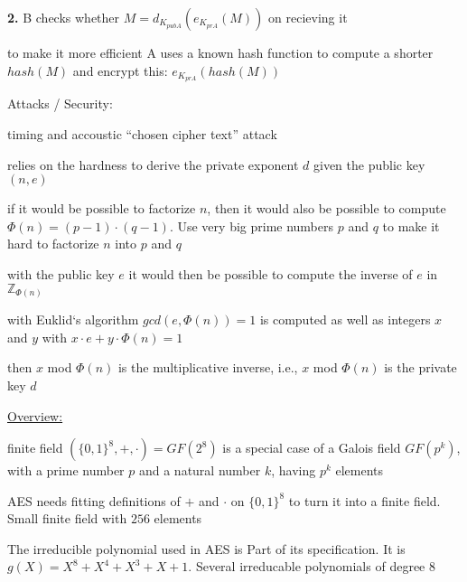 \documentclass[landscape, a4paper]{article}
\begin{document}
\begin{minipage}[t]{0.2\linewidth}
\begin{betterlist}
\begin{betterlist}
			\item[\color{PrimaryColor}\textbf{2.} ] B checks whether $M = d_{K_{pubA}}(e_{K_{prA}}(M))$ on recieving it
			\item to make it more efficient A uses a known hash function to compute a shorter $hash(M)$ and encrypt this: $e_{K_{prA}}(hash(M))$
		\end{betterlist}
		\item \alert{Attacks / Security:}
		\begin{betterlist}
			\item timing and accoustic \enquote{chosen cipher text} attack
			\item relies on the hardness to derive the \alert{private exponent} $d$ given the public key $(n, e)$
			\item if it would be possible to factorize $n$, then it would also be possible to compute $\Phi(n)= (p - 1) \cdot (q - 1)$. Use very big prime numbers $p$ and $q$ to make it hard to factorize $n$ into $p$ and $q$
			\item with the public key $e$ it would then be possible to compute the inverse of $e$ in $\mathbb{Z}_{\Phi(n)}$
			\begin{betterlist}
				\item with Euklid‘s algorithm $gcd(e, \Phi(n) ) = 1$ is computed as well as integers $x$ and $y$ with $x \cdot e + y \cdot \Phi(n) = 1$
				\item then $x$ mod $\Phi(n)$ is the multiplicative inverse, i.e., $x$ mod $\Phi(n)$ is the private key $d$
			\end{betterlist}
		\end{betterlist}
	\end{betterlist}
	\fbox{Mathematical background}
	\begin{betterlist}
		\item \underline{Overview:}
		\begin{betterlist}
			\item \alert{finite field} $(\{0, 1\}^8, +, \cdot)=GF(2^8)$ is a special case of a Galois field $GF(p^k)$, with a prime number $p$ and a natural number $k$, having $p^k$ elements
			\begin{betterlist}
				\item AES needs fitting definitions of $+$ and $\cdot$ on $\{0, 1\}^8$ to turn it into a \alert{finite field}. Small finite field with $256$ elements
				\item The irreducible polynomial used in AES is Part of its specification. It is $g(X) = X^8 + X^4 + X^3 + X + 1$. Several irreducable polynomials of degree $8$

\end{betterlist}
\end{betterlist}
\end{betterlist}
\end{minipage}
\end{document}
